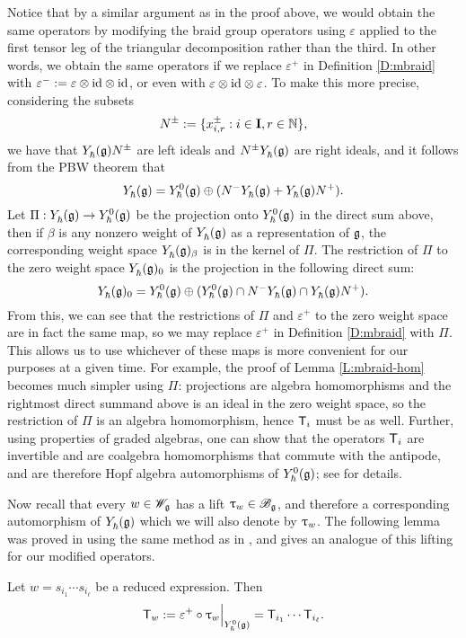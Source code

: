 Notice that by a similar argument as in the proof above, we would obtain the same operators by modifying the braid group operators using $\varepsilon$ applied to the first tensor leg of the triangular decomposition rather than the third.
In other words, we obtain the same operators if we replace $\varepsilon^+$ in Definition \ref{D:mbraid} with $\varepsilon^- := \varepsilon\otimes{\id}\otimes{\id}$, or even with $\varepsilon\otimes{\id}\otimes\varepsilon$.
To make this more precise, considering the subsets
\[N^\pm := \{x^\pm_{i,r} : i\in\I, r\in\N\},\]
we have that $\Yhg N^\pm$ are left ideals and $N^\pm \Yhg$ are right ideals, and it follows from the PBW theorem that
\[\Yhg = \Yhg[0] \oplus (N^-\Yhg + \Yhg N^+).\]
Let $\Pi:\Yhg\to\Yhg[0]$ be the projection onto $\Yhg[0]$ in the direct sum above, then if $\beta$ is any nonzero weight of $\Yhg$ as a representation of $\g$, the corresponding weight space $\Yhg_\beta$ is in the kernel of $\Pi$.
The restriction of $\Pi$ to the zero weight space $\Yhg_0$ is the projection in the following direct sum:
\[\Yhg_0 = \Yhg[0] \oplus (\Yhg[0] \cap N^-\Yhg \cap \Yhg N^+).\]
From this, we can see that the restrictions of $\Pi$ and $\varepsilon^+$ to the zero weight space are in fact the same map, so we may replace $\varepsilon^+$ in Definition \ref{D:mbraid} with $\Pi$.
This allows us to use whichever of these maps is more convenient for our purposes at a given time.
For example, the proof of Lemma \ref{L:mbraid-hom} becomes much simpler using $\Pi$: projections are algebra homomorphisms and the rightmost direct summand above is an ideal in the zero weight space, so the restriction of $\Pi$ is an algebra homomorphism, hence $\mbraid_i$ must be as well.
Further, using properties of graded algebras, one can show that the operators $\mbraid_i$ are invertible and are coalgebra homomorphisms that commute with the antipode, and are therefore Hopf algebra automorphisms of $\Yhg[0]$; see \cite[Lemma 3.5]{friesen_braid_2024} for details.

Now recall that every $w\in\Wg$ has a lift $\braid_w\in\Bg$, and therefore a corresponding automorphism of $\Yhg$ which we will also denote by $\braid_w$.
The following lemma was proved in \cite[Lemma 3.6]{friesen_braid_2024} using the same method as in \cite[Thm. 5.3.19]{weekes_highest_2016}, and gives an analogue of this lifting for our modified operators.

\begin{lemma}\label{L:Tw}
    Let $w=s_{i_1}\cdots s_{i_\ell}$ be a reduced expression. Then
    \[\mbraid_w := \varepsilon^+\circ\braid_w\Big|_{\Yhg[0]} = \mbraid_{i_1}\cdots\mbraid_{i_\ell}.\]
\end{lemma}

